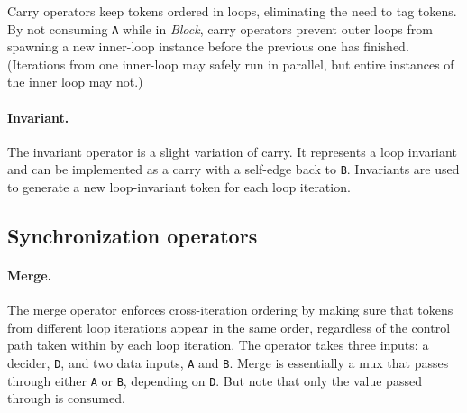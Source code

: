 Carry operators keep tokens ordered in loops, eliminating the need to tag tokens.
%
% 
By not consuming {\tt A} while in {\em Block}, carry operators prevent
outer loops from spawning a new inner-loop instance before the
previous one has finished.
%
(Iterations from one inner-loop may safely run in parallel, but entire
instances of the inner loop may not.)

\paragraph{Invariant.}
The invariant operator is a slight variation of carry.
%
It represents a loop invariant and can be implemented as a carry with a self-edge back to {\tt B}.
%
Invariants are used to generate a new loop-invariant token for each loop iteration.

%

\subsection{Synchronization operators}

\paragraph{Merge.}
The merge operator enforces cross-iteration ordering by making sure that tokens from different loop iterations
appear in the same order, regardless of the control path taken within by each loop iteration.
% 
The operator takes three inputs: a decider, {\tt D}, and two data inputs, {\tt A} and {\tt B}.
%
Merge is essentially a mux that passes through either {\tt A} or {\tt B}, depending on {\tt D}.
%
But note that only the value passed through is consumed.

